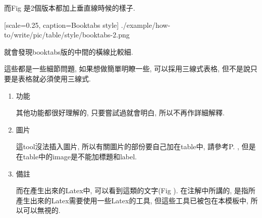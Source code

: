   而Fig 是2個版本都加上垂直線時候的樣子.

    {
      [scale=0.25,
      caption={Booktabs style}]
      {./example/how-to/write/pic/table/style/booktabs-2.png}
    }

  就會發現booktabs版的中間的橫線比較細.

  這些都是一些細節問題, 如果想做簡單明瞭一些, 可以採用三線式表格, 但不是說只要是表格就必須使用三線式.

{}

  \begin{enumerate}

  \item
  {
    功能

    其他功能都很好理解的, 只要嘗試過就會明白, 所以不再作詳細解釋.
  } %

  \item
  {
    圖片

    這tool沒法插入圖片, 所以有關圖片的部份要自己加在table中, 請參考P. , 但是在table中的image是不能加標題和label.
  } %

  \item
  {
    備註

    而在產生出來的Latex中, 可以看到這類的文字(Fig ). 在注解中所講的, 是指所產生出來的Latex需要使用一些Latex的工具, 但這些工具已被包在本模板中, 所以可以無視的.

  } %
  \end{enumerate}

\EndChapter
